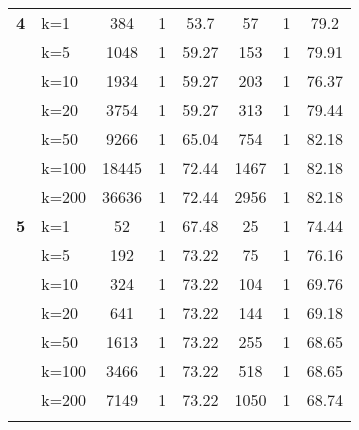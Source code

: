 \begin{table}[htbp]
\begin{tabular}{|l|l|c|c|c|c|c|c|}
    \multicolumn{1}{|r|}{\textbf{4}} & k=1 & 384 & 1 & 53.7 & 57 & 1 & 79.2 \\ 
     & k=5 & 1048 & 1 & 59.27 & 153 & 1 & 79.91 \\ 
     & k=10 & 1934 & 1 & 59.27 & 203 & 1 & 76.37 \\ 
     & k=20 & 3754 & 1 & 59.27 & 313 & 1 & 79.44 \\ 
     & k=50 & 9266 & 1 & 65.04 & 754 & 1 & 82.18 \\ 
     & k=100 & 18445 & 1 & 72.44 & 1467 & 1 & 82.18 \\ 
     & k=200 & 36636 & 1 & 72.44 & 2956 & 1 & 82.18 \\ \hline
    \multicolumn{1}{|r|}{\textbf{5}} & k=1 & 52 & 1 & 67.48 & 25 & 1 & 74.44 \\ 
     & k=5 & 192 & 1 & 73.22 & 75 & 1 & 76.16 \\ 
     & k=10 & 324 & 1 & 73.22 & 104 & 1 & 69.76 \\ 
     & k=20 & 641 & 1 & 73.22 & 144 & 1 & 69.18 \\ 
     & k=50 & 1613 & 1 & 73.22 & 255 & 1 & 68.65 \\ 
     & k=100 & 3466 & 1 & 73.22 & 518 & 1 & 68.65 \\ 
     & k=200 & 7149 & 1 & 73.22 & 1050 & 1 & 68.74 \\ \hline
     
    \label{results:usecase_}
    \end{tabular}
    \end{table}
